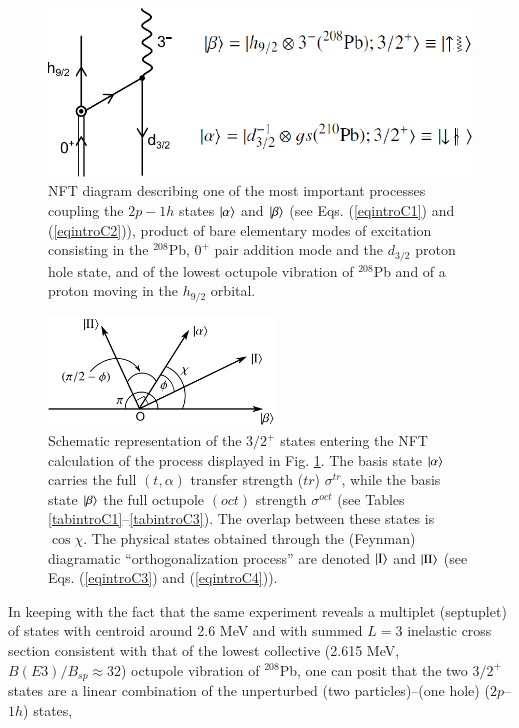 \begin{figure}
\centerline {
\includegraphics*[width=12cm]{introduccion/figs/figintroC1}
}
\caption{NFT diagram describing one of the most important processes coupling the $2p-1h$ states $|{\alpha} \rangle$ and $|{\beta} \rangle$ (see Eqs. (\ref{eqintroC1}) and (\ref{eqintroC2})), product of bare elementary modes of excitation consisting in the $^{208}$Pb, $0^+$ pair addition mode and the $d_{3/2}$ proton hole state, and of the lowest octupole vibration of $^{208}$Pb and of a proton moving in the $h_{9/2}$ orbital.}
\label{figintroC1}
\end{figure}
\begin{figure}
\centerline {
\includegraphics*[width=6cm]{introduccion/figs/figintroC2}}
\caption{Schematic representation of the $3/2^+$ states entering the NFT calculation of the process displayed in Fig. \ref{figintroC1}. The basis state $|{\alpha} \rangle$ carries the full $(t,\alpha)$ transfer strength ($tr$) $\sigma^{tr}$, while the basis state $|{\beta} \rangle$ the full octupole $(oct)$ strength $\sigma^{oct}$ (see Tables \ref{tabintroC1}--\ref{tabintroC3}). The overlap between these states is  $\cos \chi$. The physical states obtained through the (Feynman) diagramatic ``orthogonalization process'' are denoted $|{\text{I}} \rangle$ and $|{\text{II}} \rangle$ (see Eqs. (\ref{eqintroC3}) and (\ref{eqintroC4})).}
\label{figintroC2}
\end{figure}
In keeping with the fact that the same experiment reveals a multiplet (septuplet) of states with centroid around 2.6 MeV and with summed $L=3$ inelastic cross section consistent with that of the lowest collective  (2.615 MeV, $B(E3)/B_{sp}\approx 32$) octupole vibration of $^{208}$Pb, one can posit that the two $3/2^+$ states are a linear combination of the unperturbed (two particles)--(one hole) ($2p$--$1h$) states,
